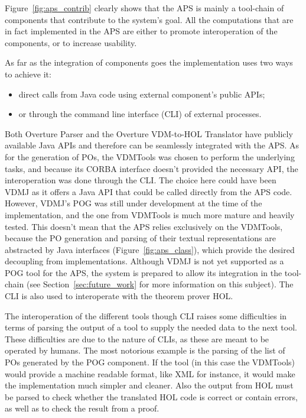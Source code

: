 \documentclass[]{article}
\begin{document}
Figure~\ref{fig:aps_contrib} clearly shows that the APS is mainly a tool-chain of components that contribute to the system's goal.
All the computations that are in fact implemented in the APS are either to promote interoperation of the components, or to increase usability.

As far as the integration of components goes the implementation uses two ways to achieve it:
\begin{itemize}
  \item direct calls from Java code using external component's public APIs;
  \item or through the command line interface (CLI) of external processes.
\end{itemize}

Both Overture Parser and the Overture VDM-to-HOL Translator have publicly available Java APIs and therefore can be seamlessly integrated with the APS.
As for the generation of POs, the VDMTools was chosen to perform the underlying tasks, and because its CORBA interface doesn't provided the necessary API, the interoperation was done through the CLI.
The choice here could have been VDMJ as it offers a Java API that could be called directly from the APS code.
However, VDMJ's POG was still under development at the time of the implementation, and the one from VDMTools is much more mature and heavily tested.
This doesn't mean that the APS relies exclusively on the VDMTools, because the PO generation and parsing of their textual representations are abstracted by Java interfaces (Figure~\ref{fig:aps_class}), which provide the desired decoupling from implementations.
Although VDMJ is not yet supported as a POG tool for the APS, the system is prepared to allow its integration in the tool-chain (see Section~\ref{sec:future_work} for more information on this subject).
The CLI is also used to interoperate with the theorem prover HOL.

The interoperation of the different tools though CLI raises some difficulties in terms of parsing the output of a tool to supply the needed data to the next tool.
These difficulties are due to the nature of CLIs, as these are meant to be operated by humans.
The most notorious example is the parsing of the list of POs generated by the POG component.
If the tool (in this case the VDMTools) would provide a machine readable format, like XML for instance, it would make the implementation much simpler and cleaner.
Also the output from HOL must be parsed to check whether the translated HOL code is correct or contain errors, as well as to check the result from a  proof.
\end{document}

